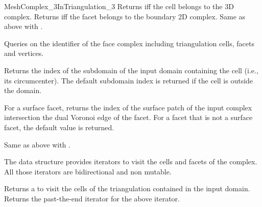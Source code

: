 \begin{ccRefConcept}{MeshComplex_3InTriangulation_3}
{Returns  iff the cell  belongs to the 3D complex.}
\ccGlue
{}
{Returns  iff the facet  belongs to the boundary 2D complex.}
\ccGlue
{}
{Same as above with .}


Queries on the identifier of the face complex 
including triangulation cells, facets and vertices.

{Returns the index of the subdomain of the input domain containing
  the cell  (i.e., its circumcenter).
The default subdomain index is returned if the cell   is outside the domain.}

{For a surface facet, returns  the index of the surface patch of the input complex
intersection the dual Voronoi edge of the facet.
For a facet that is not a surface facet, the default  value
is returned.} 


{Same as above with .}





The data structure provides iterators to visit the cells and facets of the complex.
All those iterators are bidirectional and non mutable.

{Returns a  to visit the cells of the triangulation contained in the input domain.}
\ccGlue
{}
{Returns the past-the-end iterator for the above iterator.}


\end{ccRefConcept}
